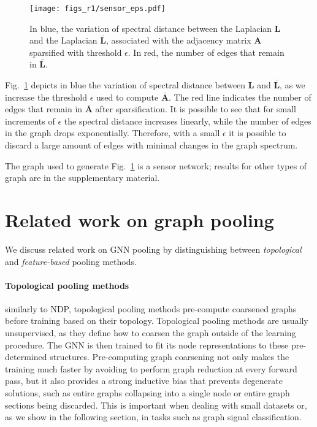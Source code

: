 \documentclass[journal]{IEEEtran}
\def\A{{\mathbf A}}
\def\L{{\mathbf L}}
\begin{document}
\begin{figure}[!ht]
	    \centering
        \texttt{[image: figs\_r1/sensor\_eps.pdf]}
	    \caption{In blue, the variation of spectral distance between the Laplacian $\L$ and the Laplacian $\bar{\L}$, associated with the adjacency matrix $\A$ sparsified with threshold $\epsilon$. In red, the number of edges that remain in $\bar{\L}$.}
	    \label{fig:varying_eps}
\end{figure}
Fig.~\ref{fig:varying_eps} depicts in blue the variation of spectral distance between $\L$ and $\bar{\L}$, as we increase the threshold $\epsilon$ used to compute $\bar \A$. 
The red line indicates the number of edges that remain in $\bar{\A}$ after sparsification.
It is possible to see that for small increments of $\epsilon$ the spectral distance increases linearly, while the number of edges in the graph drops exponentially.
Therefore, with a small $\epsilon$ it is possible to discard a large amount of edges with minimal changes in the graph spectrum.

The graph used to generate Fig.~\ref{fig:varying_eps} is a sensor network; results for other types of graph are in the supplementary material.

\section{Related work on graph pooling}
\label{sec:related_work}

We discuss related work on GNN pooling by distinguishing between \textit{topological} and \textit{feature-based} pooling methods.

\paragraph{Topological pooling methods}
similarly to NDP, topological pooling methods pre-compute coarsened graphs before training based on their topology.
Topological pooling methods are usually unsupervised, as they define how to coarsen the graph outside of the learning procedure. 
The GNN is then trained to fit its node representations to these pre-determined structures.
Pre-computing graph coarsening not only makes the training much faster by avoiding to perform graph reduction at every forward pass, but it also provides a strong inductive bias that prevents degenerate solutions, such as entire graphs collapsing into a single node or entire graph sections being discarded.
This is important when dealing with small datasets or, as we show in the following section, in tasks such as graph signal classification.
\end{document}
